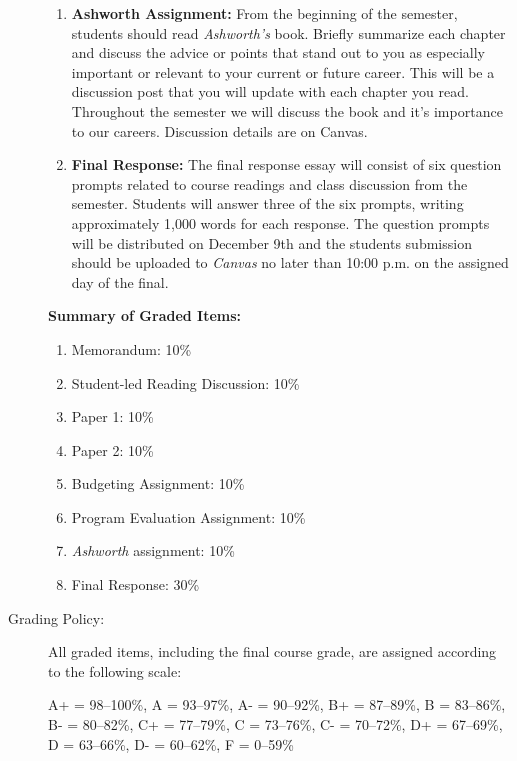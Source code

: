 \documentclass[11pt]{article}
\begin{document}
\begin{description}
\begin{enumerate}
		\item \textbf{Ashworth Assignment:} From the beginning of the semester, students should read \emph{Ashworth's} book. Briefly summarize each chapter and discuss the advice or points that stand out to you as especially important or relevant to your current or future career. This will be a discussion post that you will update with each chapter you read. Throughout the semester we will discuss the book and it's importance to our careers. Discussion details are on Canvas.
		
		\item \textbf{Final Response:} The final response essay will consist of six question prompts related to course readings and class discussion from the semester. Students will answer three of the six prompts, writing approximately 1,000 words for each response. The question prompts will be distributed on December 9th and the students submission should be uploaded to \emph{Canvas} no later than 10:00 p.m. on the assigned day of the final. 
	\end{enumerate}
	
	\item [] \textbf{Summary of Graded Items:}
	\begin{multicols}{2}
	\begin{enumerate}
		\item Memorandum: 10\%
		\item Student-led Reading Discussion: 10\%
		\item Paper 1: 10\%
		\item Paper 2: 10\%
		\item Budgeting Assignment: 10\%
		\item Program Evaluation Assignment: 10\%
		\item \emph{Ashworth} assignment: 10\%
		\item Final Response: 30\%
	\end{enumerate} 
	\end{multicols}
	
	\item[Grading Policy:] All graded items, including the final course grade, are assigned according to the following scale: 
	\begin{center}
		
		A+ = 98--100\%, A = 93--97\%, A- = 90--92\%, B+ = 87--89\%, B = 83--86\%, \\ B- = 80--82\%, C+ = 77--79\%, C = 73--76\%, C- = 70--72\%, D+ = 67--69\%, \\ D = 63--66\%, D- = 60--62\%, F = 0--59\%
	\end{center}
	

\end{description}
\end{document}
